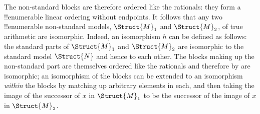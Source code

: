 \documentclass[../../include/open-logic-section]{subfiles}
\begin{document}
The non-standard blocks  are therefore ordered like the rationals:
they form a !!{enumerable} linear ordering without endpoints.  It follows
that any two !!{enumerable} non-standard models, $\Struct{M}_1$ and
$\Struct{M}_2$, of true arithmetic are isomorphic. Indeed, an
isomorphism $h$ can be defined as follows: the standard parts
of $\Struct{M}_1$ and $\Struct{M}_2$ are isomorphic to the standard
model $\Struct{N}$ and hence to each other. The blocks making up
the non-standard part are themselves ordered like the rationals and
therefore by  are isomorphic; an isomorphism
of the blocks can be extended to an isomorphism \emph{within} the
blocks by matching up arbitrary elements in each, and then taking the
image of the successor of $x$ in $\Struct{M}_1$ to be the successor
of the image of $x$ in $\Struct{M}_2$. 
\end{document}
